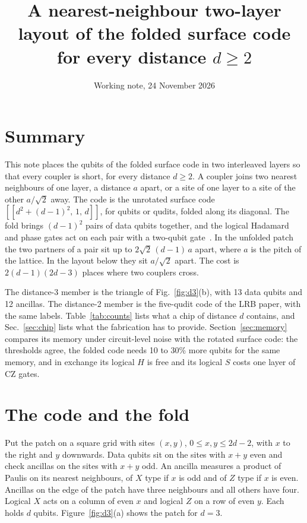 \documentclass[11pt,a4paper]{article}
\title{\vspace{-1.2cm}A nearest-neighbour two-layer layout of the folded surface code\\ for every distance $d\ge 2$}
\author{}
\date{Working note, 24 November 2026}
\begin{document}
\maketitle
\vspace{-1.4cm}

\section{Summary}

This note places the qubits of the folded surface code in two interleaved layers so that every
coupler is short, for every distance $d\ge2$. A coupler joins two nearest neighbours of one
layer, a distance $a$ apart, or a site of one layer to a site of the other $a/\sqrt2$ away.
The code is the unrotated surface code
$[[d^2+(d-1)^2,\,1,\,d]]$, for qubits or qudits, folded along its diagonal. The fold brings
$(d-1)^2$ pairs of data qubits together, and the logical Hadamard and phase gates act on each
pair with a two-qubit gate~\cite{Moussa2016}. In the unfolded patch the two partners of a pair
sit up to $2\sqrt2\,(d-1)\,a$ apart, where $a$ is the pitch of the lattice. In the layout below
they sit $a/\sqrt2$ apart. The cost is $2(d-1)(2d-3)$ places
where two couplers cross.

The distance-3 member is the triangle of Fig.~\ref{fig:d3}(b), with 13 data qubits and 12
ancillas. The distance-2 member is
the five-qudit code of the LRB paper, with the same labels. Table~\ref{tab:counts} lists what a
chip of distance $d$ contains, and Sec.~\ref{sec:chip} lists what the fabrication has to provide.
Section~\ref{sec:memory} compares its memory under circuit-level noise with the rotated surface
code: the thresholds agree, the folded code needs 10 to 30\% more qubits for the same memory, and
in exchange its logical $H$ is free and its logical $S$ costs one layer of CZ gates.

\section{The code and the fold}

Put the patch on a square grid with sites $(x,y)$, $0\le x,y\le 2d-2$, with $x$ to the right
and $y$ downwards. Data qubits sit on the sites with $x+y$ even and check ancillas on the sites
with $x+y$ odd. An ancilla measures a product of Paulis on its nearest neighbours, of $X$ type
if $x$ is odd and of $Z$ type if $x$ is even. Ancillas on the edge of the patch have three
neighbours and all others have four. Logical $X$ acts on a column of even $x$ and logical $Z$ on
a row of even $y$. Each holds $d$ qubits. Figure~\ref{fig:d3}(a) shows the patch for $d=3$.
\end{document}
